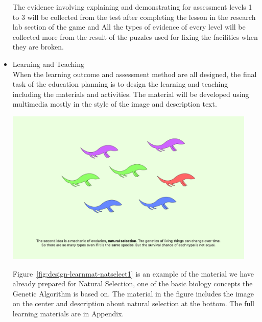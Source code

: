 \documentclass[12pt,oneside,openright,a4paper]{cpe-english-project}
\begin{document}
\begin{itemize}
\begin{enumerate}
	\end{enumerate}
	The evidence involving explaining and demonstrating for assessment levels 1 to 3 will be collected from the test after completing the lesson in the research lab section of the game and All the types of evidence of every level will be collected more from the result of the puzzles used for fixing the facilities when they are broken.

	\item Learning and Teaching \\
	When the learning outcome and assessment method are all designed, the final task of the education planning is to design the learning and teaching including the materials and activities. The material will be developed using multimedia mostly in the style of the image and description text. 

	\begin{minipage}[c]{\textwidth}\centering
	\includegraphics[width=12cm]{figure/design-learnmat-natselect1.png}
	\label{fig:design-learnmat-natselect1}
	\end{minipage}

	Figure~\ref{fig:design-learnmat-natselect1} is an example of the material we have already prepared for Natural Selection, one of the basic biology concepts the Genetic Algorithm is based on. The material in the figure includes the image on the center and description about natural selection at the bottom. The full learning materials are in Appendix. %

%


\end{itemize}
\end{document}
